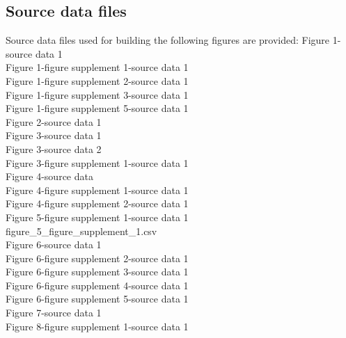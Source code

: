 \documentclass[]{article}
\begin{document}
\subsection{Source data files}\label{source-data-files}

Source data files used for building the following figures are provided:
Figure 1-source data 1\\Figure 1-figure supplement 1-source data
1\\Figure 1-figure supplement 2-source data 1\\Figure 1-figure
supplement 3-source data 1\\Figure 1-figure supplement 5-source data
1\\Figure 2-source data 1\\Figure 3-source data 1\\Figure 3-source data
2\\Figure 3-figure supplement 1-source data 1\\Figure 4-source
data\\Figure 4-figure supplement 1-source data 1\\Figure 4-figure
supplement 2-source data 1\\Figure 5-figure supplement 1-source data
1\\figure\_5\_figure\_supplement\_1.csv\\Figure 6-source data 1\\Figure
6-figure supplement 2-source data 1\\Figure 6-figure supplement 3-source
data 1\\Figure 6-figure supplement 4-source data 1\\Figure 6-figure
supplement 5-source data 1\\Figure 7-source data 1\\Figure 8-figure
supplement 1-source data 1
\end{document}
